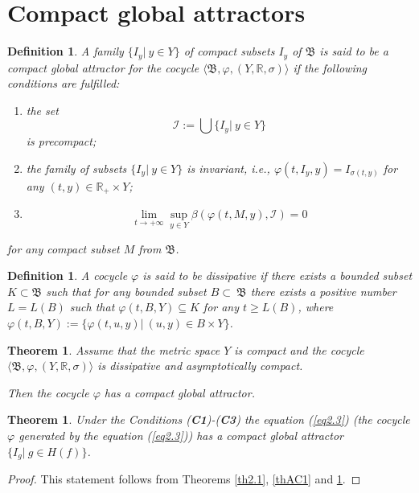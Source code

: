 \documentclass{amsart}%
\newtheorem{theorem}[lemma]{Theorem}
\newtheorem{definition}[lemma]{Definition}
\begin{document}
\section{Compact global attractors}\label{Sec5}

\begin{definition}\label{defCGA0_1} A family $\{I_{y}|\ y\in Y\}$ of
compact subsets $I_{y}$ of $\mathfrak B$ is said to be a compact
global attractor for the cocycle $\langle \mathfrak
B,\varphi,(Y,\mathbb R,\sigma)\rangle$ if the following conditions
are fulfilled:
\begin{enumerate}
\item the set
\begin{equation}\label{eqCGA1}
\mathcal I :=\bigcup \{I_{y}|\ y\in Y\}
\end{equation}
is precompact; \item the family of subsets $\{I_{y}|\ y\in Y\}$ is
invariant, i.e., $\varphi(t,I_{y},y)=I_{\sigma(t,y)}$ for any
$(t,y)\in \mathbb R_{+}\times Y$; \item
\begin{equation}\label{eqCGA2}
\lim\limits_{t\to +\infty}\sup\limits_{y\in
Y}\beta(\varphi(t,M,y),\mathcal I)=0
\end{equation}
\end{enumerate}
for any compact subset $M$ from $\mathfrak B$.
\end{definition}


\begin{definition}\label{defCGA1} A cocycle $\varphi$ is said to be
dissipative if there exists a bounded subset $K\subset \mathfrak
B$ such that for any bounded subset $B\subset \ \mathfrak B$ there
exists a positive number $L=L(B)$ such that
$\varphi(t,B,Y)\subseteq K$ for any $t\ge L(B)$, where
$\varphi(t,B,Y):=\{\varphi(t,u,y)|\ (u,y)\in B\times Y\}$.
\end{definition}


\begin{theorem}\label{thCGA1} \cite[Ch.II]{Che_2024} Assume that the metric space $Y$ is
compact and the cocycle $\langle \mathfrak B,\varphi,(Y,\mathbb
R,\sigma)\rangle$ is dissipative and asymptotically compact.

Then the cocycle $\varphi$ has a compact global attractor.
\end{theorem}

\begin{theorem}\label{thCGA2} Under the Conditions
(\textbf{C1})-(\textbf{C3}) the equation (\ref{eq2.3}) (the
cocycle $\varphi$ generated by the equation (\ref{eq2.3})) has a
compact global attractor $\{I_{g}|\ g\in H(f)\}$.
\end{theorem}
\begin{proof} This statement follows from Theorems \ref{th2.1},
\ref{thAC1} and \ref{thCGA1}.
\end{proof}
\end{document}
